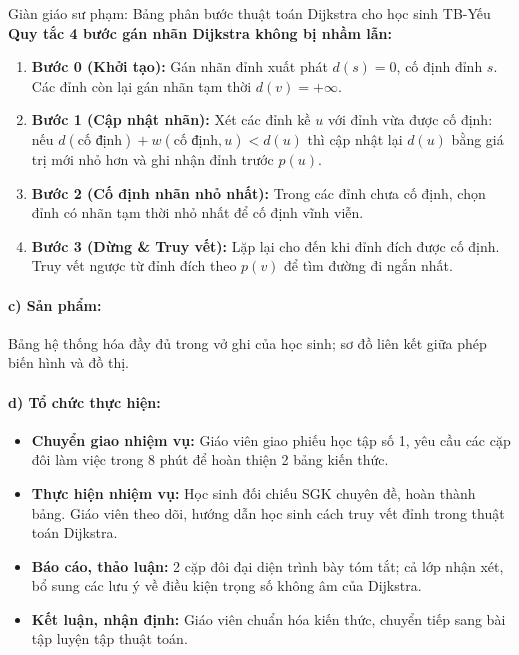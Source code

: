 \documentclass[12pt, a4paper]{article}
\begin{document}
\begin{scaffoldbox}{Giàn giáo sư phạm: Bảng phân bước thuật toán Dijkstra cho học sinh TB-Yếu}
\textbf{Quy tắc 4 bước gán nhãn Dijkstra không bị nhầm lẫn:}
\begin{enumerate}[leftmargin=0.6cm]
    \item \textbf{Bước 0 (Khởi tạo):} Gán nhãn đỉnh xuất phát $d(s) = 0$, cố định đỉnh $s$. Các đỉnh còn lại gán nhãn tạm thời $d(v) = +\infty$.
    \item \textbf{Bước 1 (Cập nhật nhãn):} Xét các đỉnh kề $u$ với đỉnh vừa được cố định: nếu $d(\text{cố định}) + w(\text{cố định}, u) < d(u)$ thì cập nhật lại $d(u)$ bằng giá trị mới nhỏ hơn và ghi nhận đỉnh trước $p(u)$.
    \item \textbf{Bước 2 (Cố định nhãn nhỏ nhất):} Trong các đỉnh chưa cố định, chọn đỉnh có nhãn tạm thời nhỏ nhất để cố định vĩnh viễn.
    \item \textbf{Bước 3 (Dừng \& Truy vết):} Lặp lại cho đến khi đỉnh đích được cố định. Truy vết ngược từ đỉnh đích theo $p(v)$ để tìm đường đi ngắn nhất.
\end{enumerate}
\end{scaffoldbox}

\paragraph{c) Sản phẩm:} Bảng hệ thống hóa đầy đủ trong vở ghi của học sinh; sơ đồ liên kết giữa phép biến hình và đồ thị.

\paragraph{d) Tổ chức thực hiện:}
\begin{itemize}[leftmargin=0.8cm]
    \item \textbf{Chuyển giao nhiệm vụ:} Giáo viên giao phiếu học tập số 1, yêu cầu các cặp đôi làm việc trong 8 phút để hoàn thiện 2 bảng kiến thức.
    \item \textbf{Thực hiện nhiệm vụ:} Học sinh đối chiếu SGK chuyên đề, hoàn thành bảng. Giáo viên theo dõi, hướng dẫn học sinh cách truy vết đỉnh trong thuật toán Dijkstra.
    \item \textbf{Báo cáo, thảo luận:} 2 cặp đôi đại diện trình bày tóm tắt; cả lớp nhận xét, bổ sung các lưu ý về điều kiện trọng số không âm của Dijkstra.
    \item \textbf{Kết luận, nhận định:} Giáo viên chuẩn hóa kiến thức, chuyển tiếp sang bài tập luyện tập thuật toán.
\end{itemize}
\end{document}
